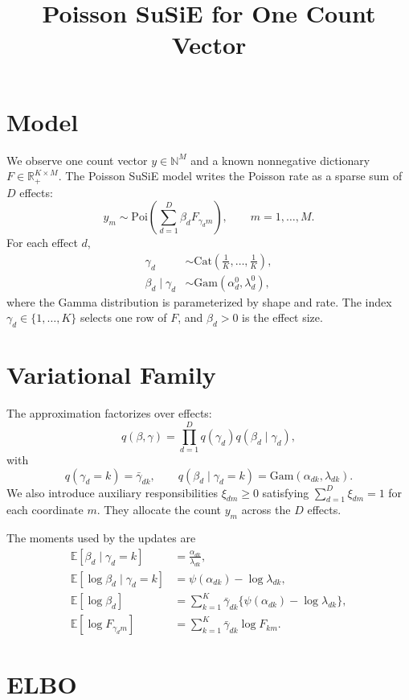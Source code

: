 \documentclass[11pt]{article}
\title{Poisson SuSiE for One Count Vector}
\author{}
\date{}
\newcommand{\Gam}{\mathrm{Gam}}
\newcommand{\Poi}{\mathrm{Poi}}
\newcommand{\Cat}{\mathrm{Cat}}
\newcommand{\E}{\mathbb{E}}
\newcommand{\gb}{\bar{\gamma}}
\begin{document}
\maketitle

\section{Model}

We observe one count vector $y \in \mathbb{N}^M$ and a known nonnegative
dictionary $F \in \mathbb{R}_+^{K \times M}$. The Poisson SuSiE model writes the
Poisson rate as a sparse sum of $D$ effects:
\[
  y_m \sim \Poi\left(\sum_{d=1}^D \beta_d F_{\gamma_d m}\right),
  \qquad m = 1,\ldots,M.
\]
For each effect $d$,
\begin{align}
  \gamma_d &\sim \Cat\left(\frac{1}{K},\ldots,\frac{1}{K}\right), \\
  \beta_d \mid \gamma_d &\sim \Gam(\alpha_d^0,\lambda_d^0),
\end{align}
where the Gamma distribution is parameterized by shape and rate. The index
$\gamma_d \in \{1,\ldots,K\}$ selects one row of $F$, and $\beta_d > 0$ is the
effect size.

\section{Variational Family}

The approximation factorizes over effects:
\[
  q(\beta,\gamma)
  = \prod_{d=1}^D q(\gamma_d) q(\beta_d \mid \gamma_d),
\]
with
\[
  q(\gamma_d = k) = \gb_{dk},
  \qquad
  q(\beta_d \mid \gamma_d = k) = \Gam(\alpha_{dk},\lambda_{dk}).
\]
We also introduce auxiliary responsibilities $\xi_{dm} \geq 0$ satisfying
$\sum_{d=1}^D \xi_{dm}=1$ for each coordinate $m$. They allocate the count
$y_m$ across the $D$ effects.

The moments used by the updates are
\begin{align}
  \E[\beta_d \mid \gamma_d = k] &= \frac{\alpha_{dk}}{\lambda_{dk}}, \\
  \E[\log \beta_d \mid \gamma_d = k] &= \psi(\alpha_{dk}) - \log \lambda_{dk}, \\
  \E[\log \beta_d] &=
    \sum_{k=1}^K \gb_{dk}\{\psi(\alpha_{dk}) - \log \lambda_{dk}\}, \\
  \E[\log F_{\gamma_d m}] &= \sum_{k=1}^K \gb_{dk}\log F_{km}.
\end{align}

\section{ELBO}
\end{document}
